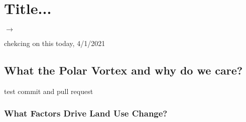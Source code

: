 \chapter{Title...}


$\rightarrow$

chekcing on this today, 4/1/2021

\section{What the Polar Vortex and why do we care?}

test commit and pull request 


\subsection{What Factors Drive Land Use Change?}




